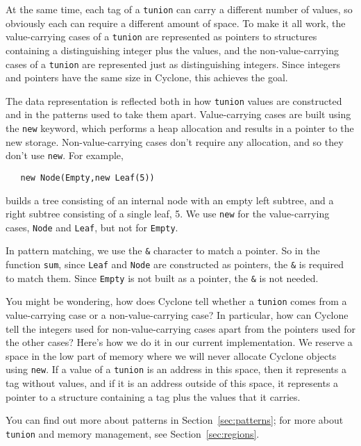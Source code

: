 At the same time, each tag of a \texttt{tunion} can carry a different
number of values, so obviously each can require a different amount of
space.  To make it all work, the value-carrying cases of a
\texttt{tunion} are represented as pointers to structures containing a
distinguishing integer plus the values, and the non-value-carrying
cases of a \texttt{tunion} are represented just as distinguishing
integers.  Since integers and pointers have the same size in Cyclone,
this achieves the goal.

The data representation is reflected both in how \texttt{tunion}
values are constructed and in the patterns used to take them apart.
Value-carrying cases are built using the \texttt{new} keyword, which
performs a heap allocation and results in a pointer to the new
storage.  Non-value-carrying cases don't require any allocation, and
so they don't use \texttt{new}.  For example,
\begin{verbatim}
   new Node(Empty,new Leaf(5))
\end{verbatim}
builds a tree consisting of an internal node with an empty left
subtree, and a right subtree consisting of a single leaf, 5.  We use
\texttt{new} for the value-carrying cases, \texttt{Node} and
\texttt{Leaf}, but not for \texttt{Empty}.

In pattern matching, we use the \texttt{\&} character to match a
pointer.  So in the function \texttt{sum}, since \texttt{Leaf} and
\texttt{Node} are constructed as pointers, the \texttt{\&} is required
to match them.  Since \texttt{Empty} is not built as a pointer, the
\texttt{\&} is not needed.

You might be wondering, how does Cyclone tell whether a
\texttt{tunion} comes from a value-carrying case or a
non-value-carrying case?  In particular, how can Cyclone tell the
integers used for non-value-carrying cases apart from the pointers
used for the other cases?  Here's how we do it in our current
implementation.  We reserve a space in the low part of memory where we
will never allocate Cyclone objects using \texttt{new}.  If a value of
a \texttt{tunion} is an address in this space, then it represents a
tag without values, and if it is an address outside of this space, it
represents a pointer to a structure containing a tag plus the values
that it carries.
  
You can find out more about patterns in Section~\ref{sec:patterns};
for more about \texttt{tunion} and memory management, see
Section~\ref{sec:regions}.

